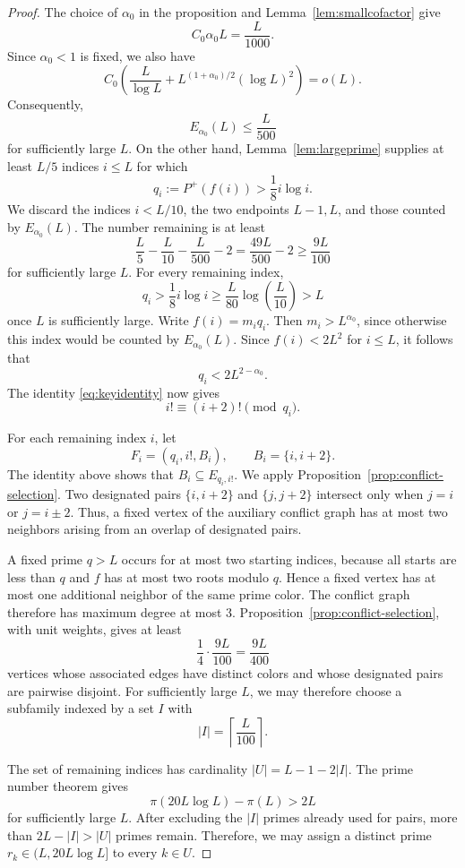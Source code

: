 \documentclass[11pt]{amsart}
\theoremstyle{definition}
\theoremstyle{remark}
\begin{document}
\begin{proof}
The choice of $\alpha_0$ in the proposition and
Lemma~\ref{lem:smallcofactor} give
\[
C_0\alpha_0L=\frac L{1000}.
\]
Since $\alpha_0<1$ is fixed, we also have
\[
C_0\left(\frac L{\log L}
+L^{(1+\alpha_0)/2}(\log L)^2\right)=o(L).
\]
Consequently,
\[
E_{\alpha_0}(L)\leq\frac L{500}
\]
for sufficiently large $L$.  On the other hand,
Lemma~\ref{lem:largeprime} supplies at least $L/5$ indices $i\leq L$ for
which
\[
q_i:=P^+(f(i))>\frac18i\log i.
\]
We discard the indices $i<L/10$, the two endpoints $L-1,L$, and those
counted by $E_{\alpha_0}(L)$.  The number remaining is at least
\[
\frac L5-\frac L{10}-\frac L{500}-2
=\frac{49L}{500}-2
\geq\frac{9L}{100}
\]
for sufficiently large $L$.  For every remaining index,
\[
q_i>\frac18 i\log i
\geq \frac{L}{80}\log\left(\frac{L}{10}\right)>L
\]
once $L$ is sufficiently large.  Write $f(i)=m_iq_i$.  Then
$m_i>L^{\alpha_0}$, since otherwise this index would be counted by
$E_{\alpha_0}(L)$.  Since $f(i)<2L^2$ for $i\leq L$, it follows that
\[
q_i<2L^{2-\alpha_0}.
\]
The identity \eqref{eq:keyidentity} now gives
\[
i!\equiv(i+2)!\pmod{q_i}.
\]

For each remaining index $i$, let
\[
F_i=(q_i,i!,B_i),
\qquad B_i=\{i,i+2\}.
\]
The identity above shows that $B_i\subseteq E_{q_i,i!}$.  We apply
Proposition~\ref{prop:conflict-selection}.  Two designated pairs
$\{i,i+2\}$ and $\{j,j+2\}$ intersect only when $j=i$ or $j=i\pm2$.
Thus, a fixed vertex of the auxiliary conflict graph has at most two
neighbors arising from an overlap of designated pairs.

A fixed prime $q>L$ occurs for at most two starting indices, because all
starts are less than $q$ and $f$ has at most two roots modulo $q$.  Hence a
fixed vertex has at most one additional neighbor of the same prime color.
The conflict graph therefore has maximum degree at most $3$.
Proposition~\ref{prop:conflict-selection}, with unit weights, gives at least
\[
\frac14\cdot\frac{9L}{100}=\frac{9L}{400}
\]
vertices whose associated edges have distinct colors and whose designated
pairs are pairwise disjoint.  For
sufficiently large $L$, we may therefore choose a subfamily indexed by a set
$I$ with
\[
|I|=\left\lceil\frac L{100}\right\rceil.
\]

The set of remaining indices has cardinality $|U|=L-1-2|I|$.  The prime
number theorem gives
\[
\pi(20L\log L)-\pi(L)>2L
\]
for sufficiently large $L$.  After excluding the $|I|$ primes already used
for pairs, more than $2L-|I|>|U|$ primes remain.  Therefore, we may assign a
distinct prime $r_k\in(L,20L\log L]$ to every $k\in U$.


\end{proof}
\end{document}
